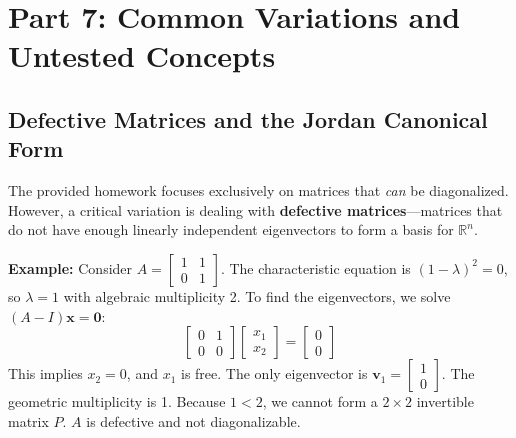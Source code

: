 \documentclass[11pt, a4paper]{article}
\theoremstyle{definition}
\theoremstyle{remark}
\newcommand{\R}{\mathbb{R}}
\begin{document}
\begin{center}
\end{center}

\newpage
\section{Part 7: Common Variations and Untested Concepts}

\subsection{Defective Matrices and the Jordan Canonical Form}
The provided homework focuses exclusively on matrices that \textit{can} be diagonalized. However, a critical variation is dealing with \textbf{defective matrices}—matrices that do not have enough linearly independent eigenvectors to form a basis for $\R^n$.

\textbf{Example:} Consider $A = \begin{bmatrix} 1 & 1 \\ 0 & 1 \end{bmatrix}$. 
The characteristic equation is $(1-\lambda)^2 = 0$, so $\lambda = 1$ with algebraic multiplicity 2. 
To find the eigenvectors, we solve $(A - I)\mathbf{x} = \mathbf{0}$:
\[
\begin{bmatrix} 0 & 1 \\ 0 & 0 \end{bmatrix} \begin{bmatrix} x_1 \\ x_2 \end{bmatrix} = \begin{bmatrix} 0 \\ 0 \end{bmatrix}
\]
This implies $x_2 = 0$, and $x_1$ is free. The only eigenvector is $\mathbf{v}_1 = \begin{bmatrix} 1 \\ 0 \end{bmatrix}$. The geometric multiplicity is 1. Because $1 < 2$, we cannot form a $2 \times 2$ invertible matrix $P$. $A$ is defective and not diagonalizable. 
\end{document}
